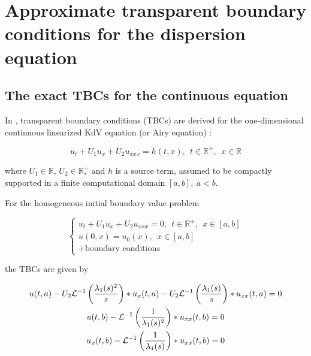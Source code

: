 \section{Approximate transparent boundary conditions for the dispersion equation}
\label{sec:TBC}

\subsection{The exact TBCs for the continuous equation}

\indent In \cite{besse2015}, transparent boundary conditions (TBCs) are derived for the one-dimensional continuous linearized KdV equation (or Airy equation) :

\begin{equation}
 	\label{eq:LKdV}
 	u_t + U_1u_x + U_2u_{xxx} = h(t,x), \ \ t \in \mathbb{R}^+, \ \ x \in \mathbb{R}
\end{equation}

\noindent where $U_1 \in \mathbb{R}$, $U_2 \in \mathbb{R}^+_*$ and $h$ is a source term, assumed to be compactly supported in a finite computational domain $[a,b], \ a < b$.

\indent For the homogeneous initial boundary value problem 

\begin{equation*}
\begin{cases}
	u_t + U_1u_x + U_2u_{xxx} = 0, \ \ t \in \mathbb{R}^+, \ \ x \in [a,b] \\
	u(0,x) = u_0(x), \ \ x \in [a,b] \\
	+ \text{boundary conditions} \nonumber
\end{cases}
\end{equation*}

\noindent the TBCs are given \cite[equations (2.17) -(2.18)]{besse2015} by 

\begin{equation}
\label{eq:continuousTBC}
\begin{gathered}
        u(t,a) - U_2 \mathcal{L}^{-1} \left( \frac{\lambda_1(s)^2}{s} \right) * u_x(t,a) - U_2 \mathcal{L}^{-1} \left( \frac{\lambda_1(s)}{s} \right) * u_{xx}(t,a) = 0 \\ 
        u(t,b) - \mathcal{L}^{-1} \left( \frac{1}{\lambda_1(s)^2} \right) * u_{xx}(t,b) = 0 \\
        u_x(t,b) - \mathcal{L}^{-1} \left( \frac{1}{\lambda_1(s)} \right) * u_{xx}(t,b) = 0 
\end{gathered}
\end{equation}

